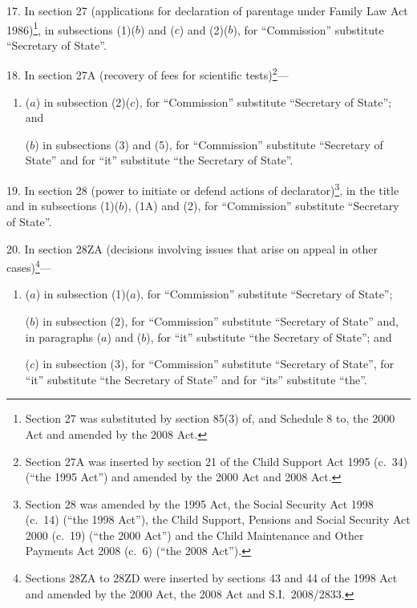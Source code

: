 \documentclass[12pt,a4paper]{article}
\begin{document}
\medskip

17.  In section 27 (applications for declaration of parentage under Family Law Act 1986)\footnote{Section 27 was substituted by section 85(3) of, and Schedule 8 to, the 2000 Act and amended by the 2008 Act.}, in subsections (1)($b$)  and ($c$)  and (2)($b$), for “Commission” substitute “Secretary of State”.

\medskip

18.  In section 27A (recovery of fees for scientific tests)\footnote{Section 27A was inserted by section 21 of the Child Support Act 1995 (c.~34) (“the 1995 Act”) and amended by the 2000 Act and 2008 Act.}—
\begin{enumerate}\item[]
($a$) in subsection (2)($c$), for “Commission” substitute “Secretary of State”; and

($b$) in subsections (3) and (5), for “Commission” substitute “Secretary of State” and for “it” substitute “the Secretary of State”.
\end{enumerate}

\medskip

19.  In section 28 (power to initiate or defend actions of declarator)\footnote{Section 28 was amended by the 1995 Act, the Social Security Act 1998 (c.~14) (“the 1998 Act”), the Child Support, Pensions and Social Security Act 2000 (c.~19) (“the 2000 Act”) and the Child Maintenance and Other Payments Act 2008 (c.~6) (“the 2008 Act”).}, in the title and in subsections (1)($b$), (1A) and (2), for “Commission” substitute “Secretary of State”.

\medskip

20.  In section 28ZA (decisions involving issues that arise on appeal in other cases)\footnote{Sections 28ZA to 28ZD were inserted by sections 43 and 44 of the 1998 Act and amended by the 2000 Act, the 2008 Act and S.I.~2008/2833.}—
\begin{enumerate}\item[]
($a$) in subsection (1)($a$), for “Commission” substitute “Secretary of State”;

($b$) in subsection (2), for “Commission” substitute “Secretary of State” and, in paragraphs ($a$)  and ($b$), for “it” substitute “the Secretary of State”; and

($c$) in subsection (3), for “Commission” substitute “Secretary of State”, for “it” substitute “the Secretary of State” and for “its” substitute “the”.
\end{enumerate}
\end{document}
